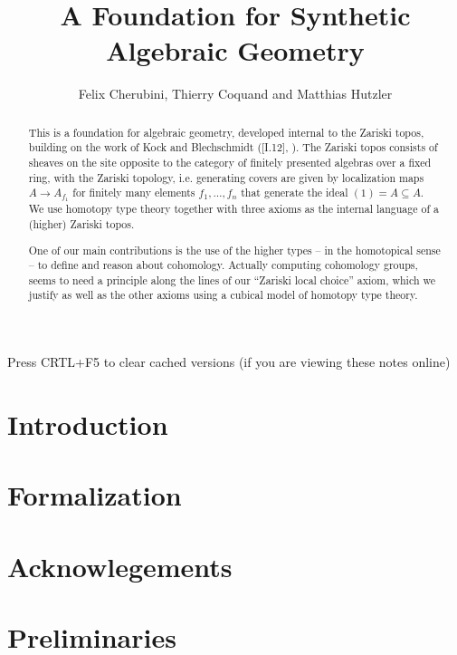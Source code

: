 \documentclass{../util/zariski}
\title{A Foundation for Synthetic Algebraic Geometry}
\author{Felix Cherubini, Thierry Coquand and Matthias Hutzler}
\begin{document}
\maketitle

\begin{center}
  \color{purple}
  \large{Press CRTL+F5 to clear cached versions}
  \large{(if you are viewing these notes online)}
\end{center}

\begin{abstract}
  This is a foundation for algebraic geometry, developed internal to the Zariski topos, building on the work of Kock and Blechschmidt (\cite{kock-sdg}[I.12], \cite{ingo-thesis}).
  The Zariski topos consists of sheaves on the site opposite to the category of finitely presented algebras over a fixed ring, with the Zariski topology, i.e. generating covers are given by localization maps $A\to A_{f_1}$ for finitely many elements $f_1,\dots,f_n$ that generate the ideal $(1)=A\subseteq A$.
  We use homotopy type theory together with three axioms as the internal language of a (higher) Zariski topos.

  One of our main contributions is the use of the higher types -- in the homotopical sense -- to define and reason about cohomology.
  Actually computing cohomology groups, seems to need a principle along the lines of our ``Zariski local choice'' axiom,
  which we justify as well as the other axioms using a cubical model of homotopy type theory.
\end{abstract}

\tableofcontents

\section*{Introduction}


\section*{Formalization}


\section*{Acknowlegements}


\section{Preliminaries}

\end{document}
